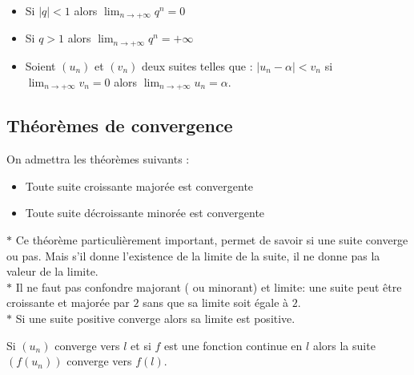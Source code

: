  \begin{remark}
 \begin{itemize}
 \item Si $ |q|<1 $  alors $ \displaystyle \lim_{n \to  +\infty} q^{n}= 0 $
 \item Si $ q>1 $  alors $ \displaystyle \lim_{n \to  +\infty} q^{n}= +\infty $
 \item Soient $(u_{n})$ et $(v_{n})$ deux suites telles que : $ |u_{n}-\alpha|< v_{n}$  si $ \displaystyle \lim_{n \to  +\infty}v_{n} = 0 $ alors $ \displaystyle \lim_{n \to  +\infty}u_{n} = \alpha .$ 
 \end{itemize}
  \end{remark}
 \subsection*{Théorèmes de convergence}
 On admettra les théorèmes suivants :
 \begin{theorem}
 \begin{itemize}
 \item   Toute suite croissante majorée est convergente \item  Toute suite décroissante minorée est convergente 
 \end{itemize}
 \end{theorem}

 \begin{remark}
 
 $ \ast $ Ce théorème particulièrement important, permet de savoir si une suite converge ou pas. Mais s'il donne l'existence de la limite de la suite, il ne donne pas la valeur de la limite.\\ 
 $ \ast $ Il ne faut pas confondre majorant ( ou minorant) et limite: une suite peut être croissante et majorée par $ 2 $ sans que sa limite soit égale à $ 2. $\\
 $ \ast $ Si une suite positive converge alors sa limite est positive.
 
\end{remark}
 \begin{theorem}
 Si $(u_{n})$ converge vers $ l $ et si $ f $ est une fonction continue en $ l $ alors la suite  $ (f(u_{n})) $ converge vers $ f(l) $.
 \end{theorem}

